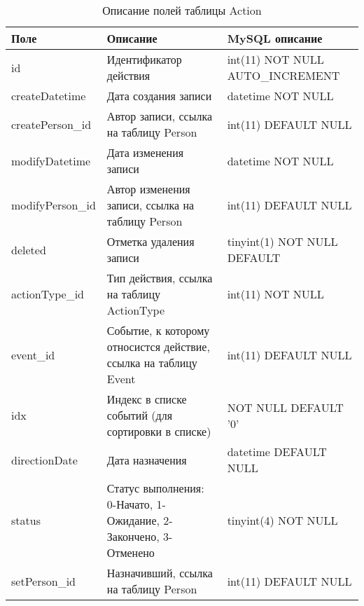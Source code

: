  {\tabulinesep=1.2mm
 \begin{longtabu} to \textwidth {|X[1,c]|X[1,l]|X[1.5,l]|}
 \caption{Описание полей таблицы Action} \label{db.ActionTable}\\
 \hline
 Поле                   & Описание                                          & MySQL описание \\                             \hline
 id                     & Идентификатор действия                            & int(11) NOT NULL AUTO\_INCREMENT \\           \hline
 createDatetime         & Дата создания записи                              & datetime NOT NULL \\                          \hline
 createPerson\_id       & Автор записи, ссылка на таблицу Person            & int(11) DEFAULT NULL \\                       \hline
 modifyDatetime         & Дата изменения записи                             & datetime NOT NULL \\                          \hline
 modifyPerson\_id       & Автор изменения записи, ссылка на таблицу Person  & int(11) DEFAULT NULL \\                       \hline
 deleted                & Отметка удаления записи                           &  tinyint(1) NOT NULL DEFAULT \\               \hline
 actionType\_id         & Тип действия, ссылка на таблицу ActionType        & int(11) NOT NULL \\                           \hline
 event\_id              & Событие, к которому относистся действие, ссылка на
                            таблицу Event                                   & int(11) DEFAULT NULL \\                       \hline
 idx                    & Индекс в списке событий (для сортировки в списке) & NOT NULL DEFAULT '0' \\                       \hline
 directionDate          & Дата назначения                                   & datetime DEFAULT NULL \\                                                                 \hline
 status                 & Статус выполнения: 0-Начато, 1-Ожидание,
                            2-Закончено, 3-Отменено                         & tinyint(4) NOT NULL \\                        \hline
 setPerson\_id          & Назначивший, ссылка на таблицу Person             & int(11) DEFAULT NULL \\                       \hline

\end{longtabu}}
